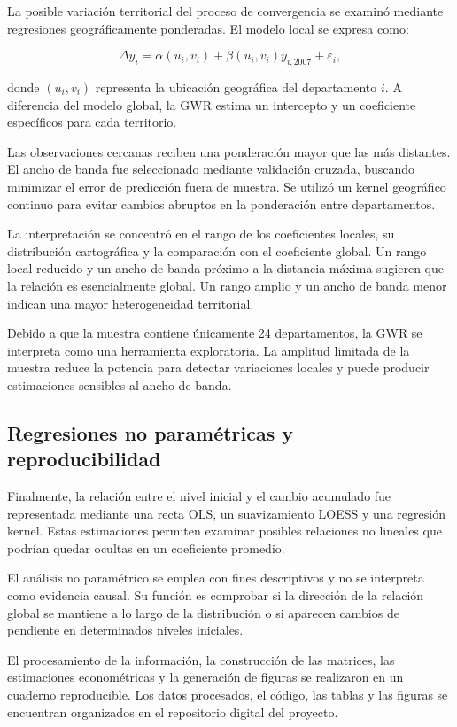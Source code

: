 La posible variación territorial del proceso de convergencia se examinó
mediante regresiones geográficamente ponderadas. El modelo local se expresa
como:

\begin{equation}
\Delta y_i
=
\alpha(u_i,v_i)
+
\beta(u_i,v_i)y_{i,2007}
+
\varepsilon_i,
\label{eq:gwr}
\end{equation}

donde $(u_i,v_i)$ representa la ubicación geográfica del departamento $i$.
A diferencia del modelo global, la GWR estima un intercepto y un coeficiente
específicos para cada territorio.

Las observaciones cercanas reciben una ponderación mayor que las más distantes.
El ancho de banda fue seleccionado mediante validación cruzada, buscando
minimizar el error de predicción fuera de muestra. Se utilizó un kernel
geográfico continuo para evitar cambios abruptos en la ponderación entre
departamentos.

La interpretación se concentró en el rango de los coeficientes locales, su
distribución cartográfica y la comparación con el coeficiente global. Un rango
local reducido y un ancho de banda próximo a la distancia máxima sugieren que
la relación es esencialmente global. Un rango amplio y un ancho de banda menor
indican una mayor heterogeneidad territorial.

Debido a que la muestra contiene únicamente 24 departamentos, la GWR se
interpreta como una herramienta exploratoria. La amplitud limitada de la
muestra reduce la potencia para detectar variaciones locales y puede producir
estimaciones sensibles al ancho de banda.

\subsection{Regresiones no paramétricas y reproducibilidad}

Finalmente, la relación entre el nivel inicial y el cambio acumulado fue
representada mediante una recta OLS, un suavizamiento LOESS y una regresión
kernel. Estas estimaciones permiten examinar posibles relaciones no lineales
que podrían quedar ocultas en un coeficiente promedio.

El análisis no paramétrico se emplea con fines descriptivos y no se interpreta
como evidencia causal. Su función es comprobar si la dirección de la relación
global se mantiene a lo largo de la distribución o si aparecen cambios de
pendiente en determinados niveles iniciales.

El procesamiento de la información, la construcción de las matrices, las
estimaciones econométricas y la generación de figuras se realizaron en un
cuaderno reproducible. Los datos procesados, el código, las tablas y las
figuras se encuentran organizados en el repositorio digital del proyecto.
